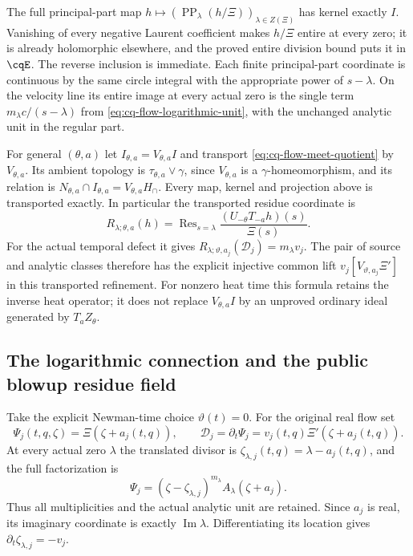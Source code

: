 The full principal-part map
$h\mapsto(\operatorname{PP}_\lambda(h/\Xi))_{\lambda\in Z(\Xi)}$
has kernel exactly $I$. Vanishing of every negative Laurent
coefficient makes $h/\Xi$ entire at every zero; it is already
holomorphic elsewhere, and the proved entire division bound
puts it in $\cqE$. The reverse inclusion is immediate.
Each finite principal-part coordinate is continuous by the same
circle integral with the appropriate power of $s-\lambda$.
On the velocity line its entire image at every actual zero is
the single term $m_\lambda c/(s-\lambda)$ from
\eqref{eq:cq-flow-logarithmic-unit}, with the unchanged analytic
unit in the regular part.

For general $(\theta,a)$ let
$I_{\theta,a}=V_{\theta,a}I$ and transport
\eqref{eq:cq-flow-meet-quotient} by $V_{\theta,a}$.
Its ambient topology is
$\tau_{\theta,a}\vee\gamma$, since $V_{\theta,a}$ is a
$\gamma$-homeomorphism, and its relation is
$N_{\theta,a}\cap I_{\theta,a}=V_{\theta,a}H_\cap$.
Every map, kernel and projection above is transported exactly.
In particular the transported residue coordinate is
\[
 R_{\lambda;\theta,a}(h)
 =\operatorname{Res}_{s=\lambda}
           \frac{(U_{-\theta}T_{-a}h)(s)}{\Xi(s)}.
\]
For the actual temporal defect it gives
$R_{\lambda;\vartheta,a_j}(\mathcal D_j)=m_\lambda v_j$.
The pair of source and analytic classes therefore has the
explicit injective common lift
$v_j[V_{\vartheta,a_j}\Xi']$ in this transported refinement.
For nonzero heat time this formula retains the inverse heat
operator; it does not replace $V_{\theta,a}I$ by an unproved
ordinary ideal generated by $T_aZ_\theta$.

\subsection{The logarithmic connection and the public blowup residue field}

Take the explicit Newman-time choice $\vartheta(t)=0$.
For the original real flow set
\[
 \Psi_j(t,q,\zeta)=\Xi(\zeta+a_j(t,q)),\qquad
 \mathcal D_j=\partial_t\Psi_j
             =v_j(t,q)\Xi'(\zeta+a_j(t,q)).
\]
At every actual zero $\lambda$ the translated divisor is
$\zeta_{\lambda,j}(t,q)=\lambda-a_j(t,q)$, and the full factorization
is
\[
 \Psi_j=
 (\zeta-\zeta_{\lambda,j})^{m_\lambda}
 A_\lambda(\zeta+a_j).
\]
Thus all multiplicities and the actual analytic unit are retained.
Since $a_j$ is real, its imaginary coordinate is exactly
$\operatorname{Im}\lambda$. Differentiating its location gives
$\partial_t\zeta_{\lambda,j}=-v_j$.

